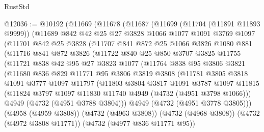 \begin{lexlean}{RustStd}
\begin{coremodule}
{\begin{coremodule}
{{{{{{{{{{{{{{@12036 := @10192
    (@11669
      (@11678
        (@11687
          (@11699
            (@11704 (@11891 @11893 @9999))
            (@11689
              @842
              @42
              @25
              @27
              @3828
              @1066
              @1077
              @1091
              @3769
              @1097
              (@11701
                @842
                @25
                @3828
                (@11707
                  @841
                  @872
                  @25
                  @1066
                  @3826
                  @1080
                  @881
                  (@11716
                    @841
                    @872
                    @3826
                    (@11722
                      @840
                      @25
                      @850
                      @3707
                      @3825
                      @11755
                      (@11721
                        @838
                        @42
                        @95
                        @27
                        @3823
                        @1077
                        (@11764
                          @838
                          @95
                          @3806
                          @3821
                          (@11680
                            @836
                            @829
                            @11771
                            @95
                            @3806
                            @3819
                            @3808
                            (@11781
                              @3805
                              @3818
                              @1091
                              @3777
                              @1097
                              @11797
                              (@11803
                                @3804
                                @3817
                                @1091
                                @3787
                                @1097
                                @11815
                                (@11824 @3797 @1097 @11830 @11740 @4949 (@4732 (@4951 @3798 @1066)))
                                @4949
                                (@4732 (@4951 @3788 @3804)))
                              @4949
                              (@4732 (@4951 @3778 @3805)))
                            (@4958 (@4959 @3808))
                            (@4732 (@4963 @3808))
                            (@4732 (@4968 @3808))
                            (@4732 (@4972 @3808 @11771))
                            (@4732 (@4977 @836 @11771 @95))
}}}}}}}}}}}}}}
\end{coremodule}}
\end{coremodule}
\end{lexlean}
